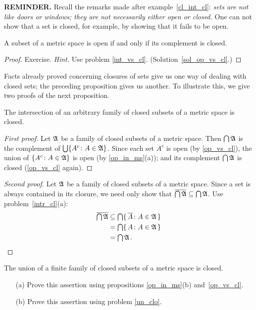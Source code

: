 \textbf{REMINDER.}  Recall the remarks made after example~\ref{cl_int_cl}: \emph{sets are not
like doors or windows; they are not necessarily either open or closed.}  One can not show that
a set is closed, for example, by showing that it fails to be open.

\begin{prop}\label{op_vs_cl} A subset of a metric space is open if and only if its complement
is closed.
\end{prop}

\begin{proof} Exercise. \emph{Hint.} Use problem \ref{int_vs_cl}. (Solution~\ref{sol_op_vs_cl}.) \ns
\end{proof}

Facts already proved concerning closures of sets give us one way of dealing with closed sets;
the preceding proposition gives us another. To illustrate this, we give two proofs of the next
proposition.

\begin{prop} The intersection of an arbitrary family of closed subsets of a metric space is closed.
\end{prop}

\begin{proof}[First proof] Let $\mathfrak{A}$ be a family of closed subsets of a metric space.  Then
$\bigcap \mathfrak{A}$ is the complement of $\bigcup \{A^c\colon A \in \mathfrak{A}\}$.  Since each
set $A^c$ is open (by \ref{op_vs_cl}), the union of $\{A^c \colon A \in \mathfrak{A}\}$ is
open (by \ref{op_in_ms}(a)); and its complement $\bigcap \mathfrak{A}$ is closed
(\ref{op_vs_cl} again).
\end{proof}

\begin{proof}[Second proof] Let $\mathfrak{A}$ be a family of closed subsets of a metric space. Since a
set is always contained in its closure, we need only show that $\overline{\bigcap \mathfrak{A}}
\subseteq \bigcap \mathfrak{A}$. Use problem~\ref{intr_cl}(a):
 \begin{align*}
    \overline{\textstyle\bigcap \mathfrak{A}}
                   &\subseteq \textstyle\bigcap\{\,\overline{A} \colon A \in \mathfrak{A}\,\} \\
                   &= \textstyle\bigcap\{\,A \colon A \in \mathfrak{A}\,\} \\
                   &= \textstyle\bigcap \mathfrak{A}\,.   \qedhere
 \end{align*}
\end{proof}

\begin{prob} The union of a finite family of closed subsets of a metric space is closed.
 \begin{enumerate}
  \item[(a)] Prove this assertion using propositions \ref{op_in_ms}(b) and~\ref{op_vs_cl}.
  \item[(b)] Prove this assertion using problem \ref{un_clo}.
 \end{enumerate}
\end{prob}

